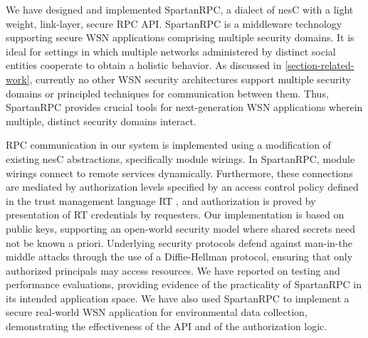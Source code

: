 We have designed and implemented SpartanRPC, a dialect of nesC with a
light weight, link-layer, secure RPC API. SpartanRPC is a middleware
technology supporting secure WSN applications comprising multiple
security domains. It is ideal for settings in which multiple networks
administered by distinct social entities cooperate to obtain a
holistic behavior. As discussed in \autoref{section-related-work},
currently no other WSN security architectures support multiple
security domains or principled techniques for communication between
them. Thus, SpartanRPC provides crucial tools for next-generation WSN
applications wherein multiple, distinct security domains interact.

RPC communication in our system is implemented using a modification of
existing nesC abstractions, specifically module wirings. In
SpartanRPC, module wirings connect to remote services dynamically.
Furthermore, these connections are mediated by authorization levels
specified by an access control policy defined in the trust management
language RT \cite{Li:DRBTMF}, and authorization is proved by
presentation of RT credentials by requesters. Our implementation is
based on public keys, supporting an open-world security model where
shared secrets need not be known a priori. Underlying security
protocols defend against man-in-the middle attacks through the use of
a Diffie-Hellman protocol, ensuring that only authorized principals
may access resources. We have reported on testing and performance
evaluations, providing evidence of the practicality of SpartanRPC in
its intended application space.  We have also used SpartanRPC to
implement a secure real-world WSN application for environmental data
collection, demonstrating the effectiveness of the API and of the
authorization logic.
